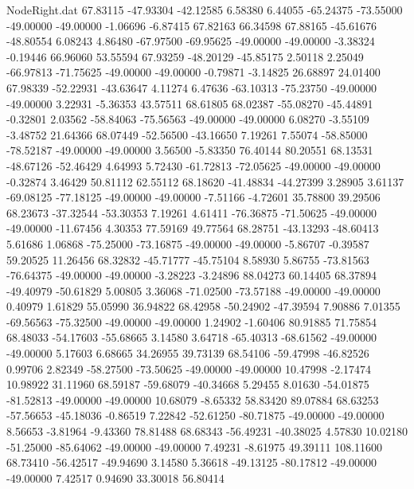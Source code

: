\begin{filecontents}{NodeRight.dat}
  67.83115  -47.93304  -42.12585     6.58380    6.44055  -65.24375  -73.55000  -49.00000  -49.00000   -1.06696   -6.87415   67.82163   66.34598
  67.88165  -45.61676  -48.80554     6.08243    4.86480  -67.97500  -69.95625  -49.00000  -49.00000   -3.38324   -0.19446   66.96060   53.55594
  67.93259  -48.20129  -45.85175     2.50118    2.25049  -66.97813  -71.75625  -49.00000  -49.00000   -0.79871   -3.14825   26.68897   24.01400
  67.98339  -52.22931  -43.63647     4.11274    6.47636  -63.10313  -75.23750  -49.00000  -49.00000    3.22931   -5.36353   43.57511   68.61805
  68.02387  -55.08270  -45.44891    -0.32801    2.03562  -58.84063  -75.56563  -49.00000  -49.00000    6.08270   -3.55109   -3.48752   21.64366
  68.07449  -52.56500  -43.16650     7.19261    7.55074  -58.85000  -78.52187  -49.00000  -49.00000    3.56500   -5.83350   76.40144   80.20551
  68.13531  -48.67126  -52.46429     4.64993    5.72430  -61.72813  -72.05625  -49.00000  -49.00000   -0.32874    3.46429   50.81112   62.55112
  68.18620  -41.48834  -44.27399     3.28905    3.61137  -69.08125  -77.18125  -49.00000  -49.00000   -7.51166   -4.72601   35.78800   39.29506
  68.23673  -37.32544  -53.30353     7.19261    4.61411  -76.36875  -71.50625  -49.00000  -49.00000  -11.67456    4.30353   77.59169   49.77564
  68.28751  -43.13293  -48.60413     5.61686    1.06868  -75.25000  -73.16875  -49.00000  -49.00000   -5.86707   -0.39587   59.20525   11.26456
  68.32832  -45.71777  -45.75104     8.58930    5.86755  -73.81563  -76.64375  -49.00000  -49.00000   -3.28223   -3.24896   88.04273   60.14405
  68.37894  -49.40979  -50.61829     5.00805    3.36068  -71.02500  -73.57188  -49.00000  -49.00000    0.40979    1.61829   55.05990   36.94822
  68.42958  -50.24902  -47.39594     7.90886    7.01355  -69.56563  -75.32500  -49.00000  -49.00000    1.24902   -1.60406   80.91885   71.75854
  68.48033  -54.17603  -55.68665     3.14580    3.64718  -65.40313  -68.61562  -49.00000  -49.00000    5.17603    6.68665   34.26955   39.73139
  68.54106  -59.47998  -46.82526     0.99706    2.82349  -58.27500  -73.50625  -49.00000  -49.00000   10.47998   -2.17474   10.98922   31.11960
  68.59187  -59.68079  -40.34668     5.29455    8.01630  -54.01875  -81.52813  -49.00000  -49.00000   10.68079   -8.65332   58.83420   89.07884
  68.63253  -57.56653  -45.18036    -0.86519    7.22842  -52.61250  -80.71875  -49.00000  -49.00000    8.56653   -3.81964   -9.43360   78.81488
  68.68343  -56.49231  -40.38025     4.57830   10.02180  -51.25000  -85.64062  -49.00000  -49.00000    7.49231   -8.61975   49.39111  108.11600
  68.73410  -56.42517  -49.94690     3.14580    5.36618  -49.13125  -80.17812  -49.00000  -49.00000    7.42517    0.94690   33.30018   56.80414

\end{filecontents}
